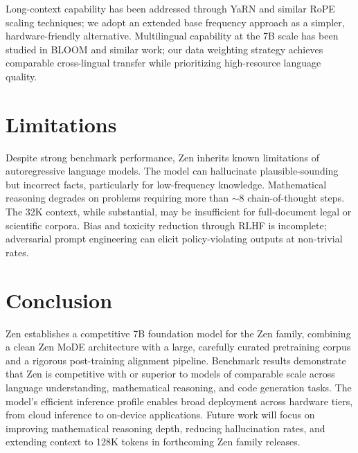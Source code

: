 \documentclass[11pt,a4paper]{article}
\begin{document}
Long-context capability has been addressed through YaRN \cite{peng2023yarn} and similar RoPE
scaling techniques; we adopt an extended base frequency approach as a simpler, hardware-friendly
alternative. Multilingual capability at the 7B scale has been studied in BLOOM \cite{scao2022bloom}
and similar work; our data weighting strategy achieves comparable cross-lingual transfer while
prioritizing high-resource language quality.

\section{Limitations}

Despite strong benchmark performance, Zen inherits known limitations of autoregressive language
models. The model can hallucinate plausible-sounding but incorrect facts, particularly for
low-frequency knowledge. Mathematical reasoning degrades on problems requiring more than $\sim$8
chain-of-thought steps. The 32K context, while substantial, may be insufficient for full-document
legal or scientific corpora. Bias and toxicity reduction through RLHF is incomplete; adversarial
prompt engineering can elicit policy-violating outputs at non-trivial rates.

\section{Conclusion}

Zen establishes a competitive 7B foundation model for the Zen family, combining a clean Zen MoDE
architecture with a large, carefully curated pretraining corpus and a rigorous post-training
alignment pipeline. Benchmark results demonstrate that Zen is competitive with or superior to
models of comparable scale across language understanding, mathematical reasoning, and code
generation tasks. The model's efficient inference profile enables broad deployment across hardware
tiers, from cloud inference to on-device applications. Future work will focus on improving
mathematical reasoning depth, reducing hallucination rates, and extending context to 128K tokens
in forthcoming Zen family releases.
\end{document}
